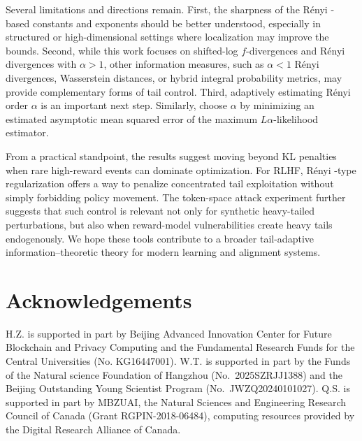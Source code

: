 \documentclass[11pt]{article}
\providecommand{\Renyi}{R\'enyi }
\begin{document}
Several limitations and directions remain. First, the sharpness of the
\Renyi-based constants and exponents should be better understood, especially in
structured or high-dimensional settings where localization may improve the
bounds. %
Second, while this work focuses on shifted-log
$f$-divergences and \Renyi divergences with $\alpha>1$, other information
measures, such as $\alpha<1$ \Renyi divergences, Wasserstein distances, or hybrid
integral probability metrics, may provide complementary forms of tail control. Third, adaptively estimating \Renyi order $\alpha$ is an important next step. Similarly, \cite{ferrari2010maximum} choose $\alpha$ by minimizing an estimated asymptotic mean squared error of the maximum $L\alpha$-likelihood estimator.


From a practical standpoint, the results suggest moving beyond KL penalties when
rare high-reward events can dominate optimization. For RLHF, \Renyi-type
regularization offers a way to penalize concentrated tail exploitation without
simply forbidding policy movement. The token-space attack experiment further
suggests that such control is relevant not only for synthetic heavy-tailed
perturbations, but also when reward-model vulnerabilities create heavy tails
endogenously. We hope these tools contribute to a broader tail-adaptive
information--theoretic theory for modern learning and alignment systems. 

\section*{Acknowledgements}
\noindent H.Z. is supported in part by Beijing Advanced Innovation Center for Future Blockchain and Privacy Computing and the Fundamental Research Funds for the Central Universities (No. KG16447001). W.T. is supported in part by the Funds of the Natural science Foundation of Hangzhou (No.~2025SZRJJ1388) and the Beijing Outstanding Young Scientist Program (No.~JWZQ20240101027).  Q.S. is supported in part by MBZUAI, the Natural Sciences and Engineering Research Council of Canada (Grant RGPIN-2018-06484), computing resources provided by the Digital Research Alliance of Canada.


\end{document}
